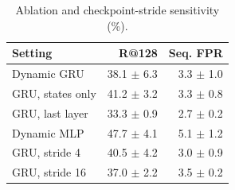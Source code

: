 \begin{table}[t]
\centering\footnotesize
\caption{Ablation and checkpoint-stride sensitivity (\%).}\label{tab:ablation}
\begin{tabular}{lrr}\toprule
Setting & R@128 & Seq. FPR \\
\midrule
Dynamic GRU & 38.1 $\pm$ 6.3 & 3.3 $\pm$ 1.0 \\
GRU, states only & 41.2 $\pm$ 3.2 & 3.3 $\pm$ 0.8 \\
GRU, last layer & 33.3 $\pm$ 0.9 & 2.7 $\pm$ 0.2 \\
Dynamic MLP & 47.7 $\pm$ 4.1 & 5.1 $\pm$ 1.2 \\
GRU, stride 4 & 40.5 $\pm$ 4.2 & 3.0 $\pm$ 0.9 \\
GRU, stride 16 & 37.0 $\pm$ 2.2 & 3.5 $\pm$ 0.2 \\
\bottomrule\end{tabular}
\end{table}
